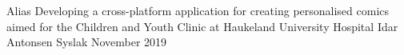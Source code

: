 \documentclass[a4paper, 11pt]{report}
\begin{document}
    \maketitlepage
        {Alias}
        {Developing a cross-platform application for creating personalised comics aimed for the Children and Youth Clinic at Haukeland University Hospital}
        {Idar Antonsen Syslak}
        {November 2019}
    
    
    
    
    
    \tableofcontents
    \listoffigures
    \listoftables
    
    
    
    
    
    
    
    
    
    \printbibliography
    
    \appendix
\end{document}
